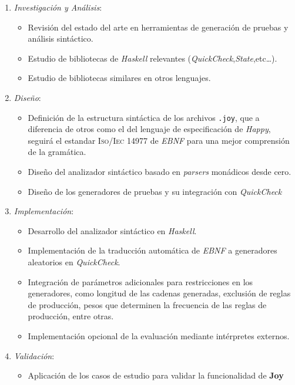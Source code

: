 \documentclass[11pt]{article}
\begin{document}
\begin{enumerate}
\item \textit{Investigación y Análisis}:

  \begin{itemize}
  \item Revisión del estado del arte en herramientas de generación de pruebas y análisis sintáctico.
  \item Estudio de bibliotecas de \textit{Haskell} relevantes (\textit{QuickCheck},\textit{State},etc\ldots).
  \item Estudio de bibliotecas similares en otros lenguajes.
  \end{itemize}
\item \textit{Diseño}:

  \begin{itemize}
  \item Definición de la estructura sintáctica de los archivos \texttt{.joy}, que a diferencia de otros como el del lenguaje de especificación de \textit{Happy}\cite{happy_docs}, seguirá el estandar \textsc{Iso/Iec 14977} de \textit{EBNF} para una mejor comprensión de la gramática.
  \item Diseño del analizador sintáctico basado en \textit{parsers} monádicos desde cero.
  \item Diseño de los generadores de pruebas y su integración con \textit{QuickCheck}
  \end{itemize}
\item \textit{Implementación}:

  \begin{itemize}
  \item Desarrollo del analizador sintáctico en \textit{Haskell}.
  \item Implementación de la traducción automática de \textit{EBNF} a generadores aleatorios en \textit{QuickCheck}.
  \item Integración de parámetros adicionales para restricciones en los generadores, como longitud de las cadenas generadas, exclusión de reglas de producción, pesos que determinen la frecuencia de las reglas de producción, entre otras.
  \item Implementación opcional de la evaluación mediante intérpretes externos.
  \end{itemize}
\item \textit{Validación}:

  \begin{itemize}
  \item Aplicación de los casos de estudio para validar la funcionalidad de \textbf{Joy}


\end{itemize}
\end{enumerate}
\end{document}
